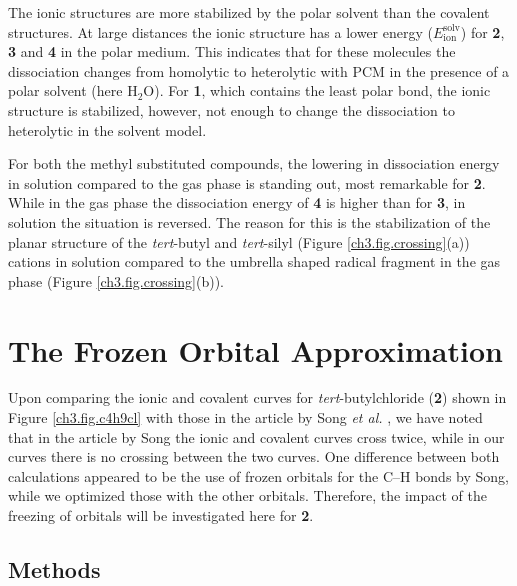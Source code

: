 The ionic structures are more stabilized by the polar solvent than the covalent structures. At large distances the ionic structure has a lower energy ($E_\mathrm{ion}^\mathrm{solv}$) for \textbf{2}, \textbf{3} and \textbf{4} in the polar medium. This indicates that for these molecules the dissociation changes from homolytic to heterolytic with PCM in the presence of a polar solvent (here H$_2$O). For \textbf{1}, which contains the least polar bond, the ionic structure is stabilized, however, not enough to change the dissociation to heterolytic in the solvent model.

For both the methyl substituted compounds, the lowering in dissociation energy in solution compared to the gas phase is standing out, most remarkable for \textbf{2}. While in the gas phase the dissociation energy of \textbf{4} is higher than for \textbf{3}, in solution the situation is reversed. The reason for this is the stabilization of the planar structure of the \textit{tert}-butyl and \textit{tert}-silyl  (Figure \ref{ch3.fig.crossing}(a)) cations in solution compared to the umbrella shaped radical fragment in the gas phase (Figure \ref{ch3.fig.crossing}(b)).

\section{The Frozen Orbital Approximation}

Upon comparing the ionic and covalent curves for \textit{tert}-butylchloride (\textbf{2}) shown in Figure \ref{ch3.fig.c4h9cl} with those in the article by Song \textit{et al.} \cite{song}, we have noted that in the article by Song the ionic and covalent curves cross twice, while in our curves there is no crossing between the two curves. One difference between both calculations appeared to be the use of frozen orbitals for the C--H bonds by Song, while we optimized those with the other orbitals. Therefore, the impact of the freezing of orbitals will be investigated here for \textbf{2}.

\subsection{Methods}

